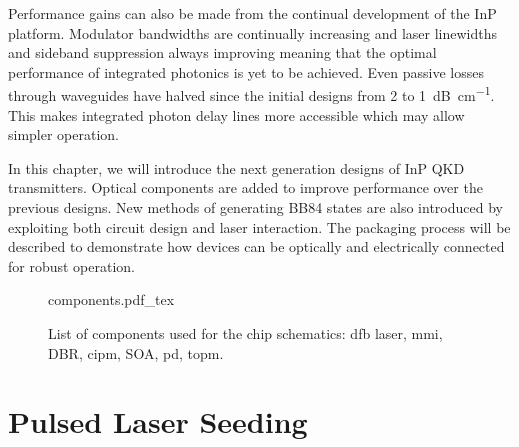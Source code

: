 
Performance gains can also be made from the continual development of the \ac{InP} platform. Modulator bandwidths are continually increasing and laser linewidths and sideband suppression always improving meaning that the optimal performance of integrated photonics is yet to be achieved. Even passive losses through waveguides have halved since the initial designs from \num{2} to \SI{1}{dB\per\cm}. This makes integrated photon delay lines more accessible which may allow simpler operation. 




In this chapter, we will introduce the next generation designs of \ac{InP} \ac{QKD} transmitters. Optical components are added to improve performance over the previous designs. New methods of generating BB84 states are also introduced by exploiting both circuit design and laser interaction. The packaging process will be described to demonstrate how devices can be optically and electrically connected for robust operation. 



\begin{figure}[t]
	\centering
	\huge	
	\def\svgwidth{0.9\textwidth} 
	{components.pdf_tex}
	\caption[Components used for chip schematics]{List of components used for the chip schematics: \acf{dfb} laser, \acf{mmi}, \acf{DBR}, \acf{cipm}, \acf{SOA}, \acf{pd}, \acf{topm}.}
	\label{fig:components}
\end{figure}

\section{Pulsed Laser Seeding}

